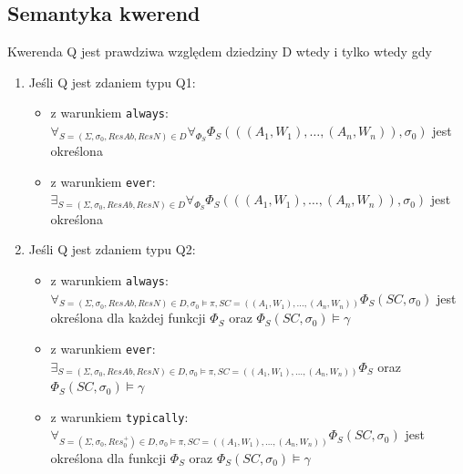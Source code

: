 \documentclass{article}
\begin{document}
\subsection{Semantyka kwerend}
Kwerenda Q jest prawdziwa względem dziedziny D wtedy i tylko wtedy gdy
\begin{enumerate}
	\item Jeśli Q jest zdaniem typu Q1:
	\begin{itemize}
		\item z warunkiem \texttt{always}: $\forall_{S=(\Sigma, \sigma_{0}, ResAb, ResN) \in D}\forall_{\Phi_{S}} \Phi_{S}(((A_{1}, W_{1}), \dots, (A_{n}, W_{n})), \sigma_{0})$ jest określona
		\item z warunkiem \texttt{ever}: 
		$\exists_{S=(\Sigma, \sigma_{0}, ResAb, ResN) \in D}\forall_{\Phi_{S}} \Phi_{S}(((A_{1}, W_{1}), \dots, (A_{n}, W_{n})), \sigma_{0})$ jest określona
	\end{itemize}
	\item Jeśli Q jest zdaniem typu Q2:
	\begin{itemize}
		\item z warunkiem \texttt{always}: 
		$\forall_{S=(\Sigma, \sigma_{0}, ResAb, ResN) \in D, \sigma_{0} \models \pi, SC=((A_{1}, W_{1}), \dots, (A_{n}, W_{n}))} \Phi_{S}(SC, \sigma_{0})$ jest określona dla każdej funkcji $\Phi_{S}$ oraz $\Phi_{S}(SC, \sigma_{0}) \models \gamma$
		\item z warunkiem \texttt{ever}:
		$\exists_{S=(\Sigma, \sigma_{0}, ResAb, ResN) \in D, \sigma_{0} \models \pi, SC=((A_{1}, W_{1}), \dots, (A_{n}, W_{n}))} \Phi_{S}$ oraz $\Phi_{S}(SC, \sigma_{0}) \models \gamma$
		\item z warunkiem \texttt{typically}:
		$\forall_{S=(\Sigma, \sigma_{0}, Res_{0}^{+}) \in D, \sigma_{0} \models \pi, SC=((A_{1}, W_{1}), \dots, (A_{n}, W_{n}))} \Phi_{S}(SC, \sigma_{0})$ jest określona dla funkcji $\Phi_{S}$ oraz $\Phi_{S}(SC, \sigma_{0}) \models \gamma$
	\end{itemize}
	

\end{enumerate}
\end{document}
